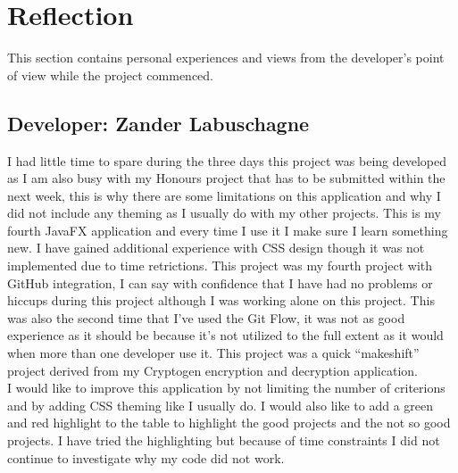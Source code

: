 \documentclass[11pt]{article}
\begin{document}
    \section{Reflection}
		This section contains personal experiences and views from the developer's point of view while the project commenced.\\

		\subsection{Developer: Zander Labuschagne}
			I had little time to spare during the three days this project was being developed as I am also busy with my Honours project that has to be submitted within the next week, this is why there are some limitations on this application and why I did not include any theming as I usually do with my other projects. This is my fourth JavaFX application and every time I use it I make sure I learn something new. I have gained additional experience with CSS design though it was not implemented due to time retrictions. This project was my fourth project with GitHub integration, I can say with confidence that I have had no problems or hiccups during this project although I was working alone on this project. This was also the second time that I've used the Git Flow, it was not as good experience as it should be because it's not utilized to the full extent as it would when more than one developer use it. This project was a quick ``makeshift'' project derived from my Cryptogen encryption and decryption application.\\

			I would like to improve this application by not limiting the number of criterions and by adding CSS theming like I usually do. I would also like to add a green and red highlight to the table to highlight the good projects and the not so good projects. I have tried the highlighting but because of time constraints I did not continue to investigate why my code did not work.

		\newpage
		
		
		\thispagestyle{plain}
		\clearpage
\end{document}
